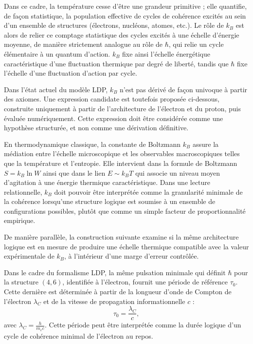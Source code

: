 \documentclass[11pt,a4paper]{article}
\begin{document}
Dans ce cadre, la température cesse d’être une grandeur primitive ; elle quantifie, de façon statistique, la population effective de cycles de cohérence excités au sein d’un ensemble de structures (électrons, nucléons, atomes, etc.). Le rôle de \(k_B\) est alors de relier ce comptage statistique des cycles excités à une échelle d’énergie moyenne, de manière strictement analogue au rôle de \(\hbar\), qui relie un cycle élémentaire à un quantum d’action. \(k_B\) fixe ainsi l’échelle énergétique caractéristique d’une fluctuation thermique par degré de liberté, tandis que \(\hbar\) fixe l’échelle d’une fluctuation d’action par cycle.

Dans l’état actuel du modèle LDP, \(k_B\) n’est pas dérivé de façon univoque à partir des axiomes. Une expression candidate est toutefois proposée ci-dessous, construite uniquement à partir de l’architecture de l’électron et du proton, puis évaluée numériquement. Cette expression doit être considérée comme une hypothèse structurée, et non comme une dérivation définitive.

En thermodynamique classique, la constante de Boltzmann \(k_B\) assure la médiation entre l’échelle microscopique et les observables macroscopiques telles que la température et l’entropie. Elle intervient dans la formule de Boltzmann \(S = k_B \ln W\) ainsi que dans le lien \(E \sim k_B T\) qui associe un niveau moyen d’agitation à une énergie thermique caractéristique. Dans une lecture relationnelle, \(k_B\) doit pouvoir être interprétée comme la granularité minimale de la cohérence lorsqu’une structure logique est soumise à un ensemble de configurations possibles, plutôt que comme un simple facteur de proportionnalité empirique.

De manière parallèle, la construction suivante examine si la même architecture logique est en mesure de produire une échelle thermique compatible avec la valeur expérimentale de \(k_B\), à l’intérieur d’une marge d’erreur contrôlée.

Dans le cadre du formalisme LDP, la même pulsation minimale qui définit \(\hbar\) pour la structure \(\left(4,6\right)\), identifiée à l’électron, fournit une période de référence \(\tau_0\). Cette dernière est déterminée à partir de la longueur d’onde de Compton de l’électron \(\lambda_C\) et de la vitesse de propagation informationnelle \(c\) :
\[
\tau_0 = \frac{\lambda_C}{c},
\]
avec \(\lambda_C = \frac{h}{m_e c}\). Cette période peut être interprétée comme la durée logique d’un cycle de cohérence minimal de l’électron au repos.
\end{document}

